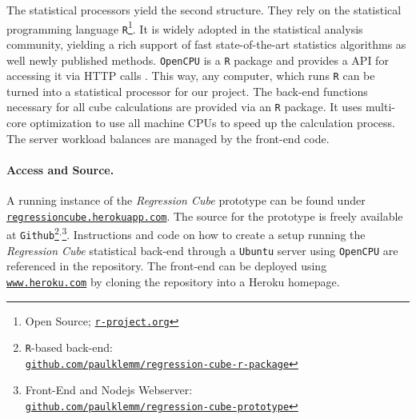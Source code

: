 \documentclass[journal]{style/vgtc} 			          %
\newcommand{\com}[1]{\textcolor{orange}{\uline{#1}}}
\begin{document}
The statistical processors yield the second structure.
They rely on the statistical programming language \texttt{R}\footnote{Open Source; \href{http://r-project.org}{\texttt{r-project.org}}}.
It is widely adopted in the statistical analysis community, yielding a rich support of fast state-of-the-art statistics algorithms as well newly published methods.
\texttt{OpenCPU} is a \texttt{R} package and provides a API for accessing it via HTTP calls \cite{Ooms}.
This way, any computer, which runs \texttt{R} can be turned into a statistical processor for our project.
The back-end functions necessary for all cube calculations are provided via an \texttt{R} package.
It uses multi-core optimization to use all machine CPUs to speed up the calculation process.
The server workload balances are managed by the front-end code.

\paragraph{Access and Source.}
A running instance of the \emph{Regression Cube} prototype can be found under \href{http://regressioncube.herokuapp.com/}{\texttt{regressioncube.herokuapp.com}}.
The source for the prototype is freely available at \texttt{Github}\footnote{\texttt{R}-based back-end: \href{https://github.com/paulklemm/regression-cube-r-package}{\\\texttt{github.com/paulklemm/regression-cube-r-package}}}$^{,}$\footnote{Front-End and Nodejs Webserver: \href{https://github.com/paulklemm/regression-cube-prototype}{\texttt{\\github.com/paulklemm/regression-cube-prototype}}}.
Instructions and code on how to create a setup running the \emph{Regression Cube} statistical back-end through a \texttt{Ubuntu} server using \texttt{OpenCPU} are referenced in the repository.
The front-end can be deployed using \href{https://www.heroku.com/}{\texttt{www.heroku.com}} by cloning the repository into a Heroku homepage. 
\end{document}

